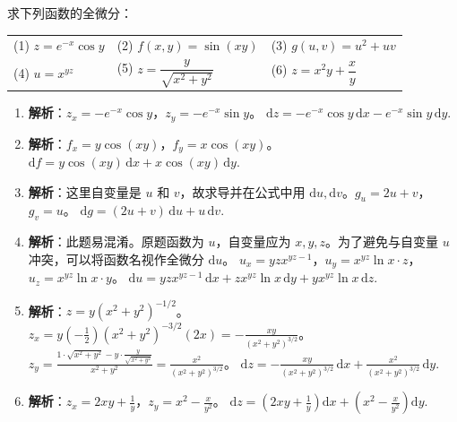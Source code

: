 \documentclass[lang=cn,11pt]{elegantbook}
\begin{document}
\begin{exercise}[全微分的计算]
求下列函数的全微分：\\
\begin{tabular}{p{}p{}p{}}
(1) $z = e^{-x}\cos y$ & (2) $f(x,y) = \sin(xy)$ & (3) $g(u,v) = u^2+uv$ \\
(4) $u = x^{yz}$ & (5) $z = \dfrac{y}{\sqrt{x^2+y^2}}$ & (6) $z = x^2y + \dfrac{x}{y}$
\end{tabular}
\end{exercise}
\begin{solution}
\begin{enumerate}
  \item[(1)] \textbf{解析}：$z_x = -e^{-x}\cos y$，$z_y = -e^{-x}\sin y$。
  $\mathrm{d}z = -e^{-x}\cos y \,\mathrm{d}x - e^{-x}\sin y \,\mathrm{d}y$.
  
  \item[(2)] \textbf{解析}：$f_x = y\cos(xy)$，$f_y = x\cos(xy)$。
  $\mathrm{d}f = y\cos(xy)\,\mathrm{d}x + x\cos(xy)\,\mathrm{d}y$.
  
  \item[(3)] \textbf{解析}：这里自变量是 $u$ 和 $v$，故求导并在公式中用 $\mathrm{d}u, \mathrm{d}v$。$g_u = 2u+v$，$g_v = u$。
  $\mathrm{d}g = (2u+v)\,\mathrm{d}u + u\,\mathrm{d}v$.
  
  \item[(4)] \textbf{解析}：此题易混淆。原题函数为 $u$，自变量应为 $x,y,z$。为了避免与自变量 $u$ 冲突，可以将函数名视作全微分 $\mathrm{d}u$。
  $u_x = yz x^{yz-1}$，$u_y = x^{yz}\ln x \cdot z$，$u_z = x^{yz}\ln x \cdot y$。
  $\mathrm{d}u = yzx^{yz-1}\,\mathrm{d}x + zx^{yz}\ln x\,\mathrm{d}y + yx^{yz}\ln x\,\mathrm{d}z$.
  
  \item[(5)] \textbf{解析}：$z = y(x^2+y^2)^{-1/2}$。
  $z_x = y(-\frac{1}{2})(x^2+y^2)^{-3/2}(2x) = -\frac{xy}{(x^2+y^2)^{3/2}}$。
  $z_y = \frac{1\cdot\sqrt{x^2+y^2} - y\cdot\frac{y}{\sqrt{x^2+y^2}}}{x^2+y^2} = \frac{x^2}{(x^2+y^2)^{3/2}}$。
  $\mathrm{d}z = -\frac{xy}{(x^2+y^2)^{3/2}}\,\mathrm{d}x + \frac{x^2}{(x^2+y^2)^{3/2}}\,\mathrm{d}y$.
  
  \item[(6)] \textbf{解析}：$z_x = 2xy + \frac{1}{y}$，$z_y = x^2 - \frac{x}{y^2}$。
  $\mathrm{d}z = \left(2xy + \frac{1}{y}\right)\mathrm{d}x + \left(x^2 - \frac{x}{y^2}\right)\mathrm{d}y$.
\end{enumerate}
\end{solution}
\end{document}
